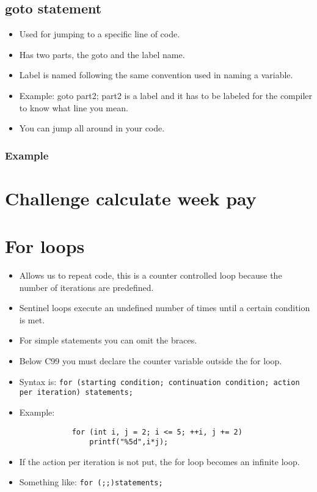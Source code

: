 \subsection{goto statement}
\begin{itemize}
    \item Used for jumping to a specific line of code.
    \item Has two parts, the goto and the label name.
    \item Label is named following the same convention used in naming a variable. 
    \item Example: goto part2; part2 is a label and it has to be labeled for the compiler to know what line you mean. 
    \item You can jump all around in your code.
\end{itemize}
\subsubsection{Example}

\section{Challenge calculate week pay}


\section{For loops }
\begin{itemize}
    \item Allows us to repeat code, this is a counter controlled loop because the number of iterations are predefined. 
    \item Sentinel loops execute an undefined number of times until a certain condition is met. 
    \item For simple statements you can omit the braces.
    \item Below C99 you must declare the counter variable outside the for loop.
    \item Syntax is: \texttt{for (starting condition; continuation condition; action per iteration) {statements;}}
    \item Example:  
        \begin{verbatim}
            for (int i, j = 2; i <= 5; ++i, j += 2) 
                printf("%5d",i*j);
        \end{verbatim}
    \item If the action per iteration is not put, the for loop becomes an infinite loop. 
    \item Something like: \texttt{for (;;){statements;}}
\end{itemize}
